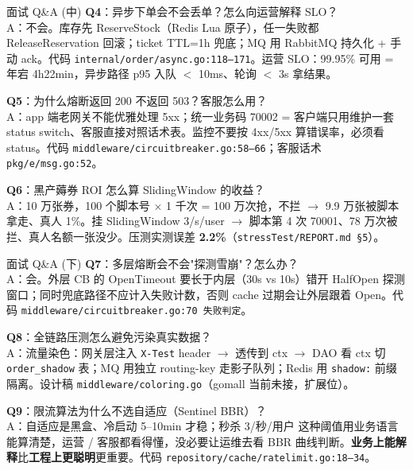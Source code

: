 \documentclass[aspectratio=169,11pt]{beamer}
\begin{document}
\begin{frame}[shrink]{面试 Q\&A (中)}
\textbf{Q4}：异步下单会不会丢单？怎么向运营解释 SLO？\\
\hspace{4mm}\small A：不会。库存先 ReserveStock（Redis Lua 原子），任一失败都 ReleaseReservation 回滚；ticket TTL=1h 兜底；MQ 用 RabbitMQ 持久化 + 手动 ack。代码 \texttt{internal/order/async.go:118--171}。运营 SLO：99.95\% 可用 = 年宕 4h22min，异步路径 p95 入队 $<$ 10ms、轮询 $<$ 3s 拿结果。

\vspace{2mm}
\textbf{Q5}：为什么熔断返回 200 不返回 503？客服怎么用？\\
\hspace{4mm}\small A：app 端老网关不能优雅处理 5xx；统一业务码 70002 = 客户端只用维护一套 status switch、客服直接对照话术表。监控不要按 4xx/5xx 算错误率，必须看 status。代码 \texttt{middleware/circuitbreaker.go:58--66}；客服话术 \texttt{pkg/e/msg.go:52}。

\vspace{2mm}
\textbf{Q6}：黑产薅券 ROI 怎么算 SlidingWindow 的收益？\\
\hspace{4mm}\small A：10 万张券，100 个脚本号 $\times$ 1 千次 = 100 万次抢，不拦 $\to$ 9.9 万张被脚本拿走、真人 1\%。挂 SlidingWindow 3/s/user $\to$ 脚本第 4 次 70001、78 万次被拦、真人名额一张没少。压测实测误差 \textbf{2.2\%}（\texttt{stressTest/REPORT.md \S 5}）。
\end{frame}

\begin{frame}[shrink]{面试 Q\&A (下)}
\textbf{Q7}：多层熔断会不会"探测雪崩"？怎么办？\\
\hspace{4mm}\small A：会。外层 CB 的 OpenTimeout 要长于内层（30s vs 10s）错开 HalfOpen 探测窗口；同时兜底路径不应计入失败计数，否则 cache 过期会让外层跟着 Open。代码 \texttt{middleware/circuitbreaker.go:70 失败判定}。

\vspace{2mm}
\textbf{Q8}：全链路压测怎么避免污染真实数据？\\
\hspace{4mm}\small A：流量染色：网关层注入 \texttt{X-Test} header $\to$ 透传到 ctx $\to$ DAO 看 ctx 切 \texttt{order\_shadow} 表；MQ 用独立 routing-key 走影子队列；Redis 用 \texttt{shadow:} 前缀隔离。设计稿 \texttt{middleware/coloring.go}（gomall 当前未接，扩展位）。

\vspace{2mm}
\textbf{Q9}：限流算法为什么不选自适应（Sentinel BBR）？\\
\hspace{4mm}\small A：自适应是黑盒、冷启动 5--10min 才稳；秒杀 3/秒/用户 这种阈值用业务语言能算清楚，运营 / 客服都看得懂，没必要让运维去看 BBR 曲线判断。\textbf{业务上能解释}比\textbf{工程上更聪明}更重要。代码 \texttt{repository/cache/ratelimit.go:18--34}。
\end{frame}
\end{document}
